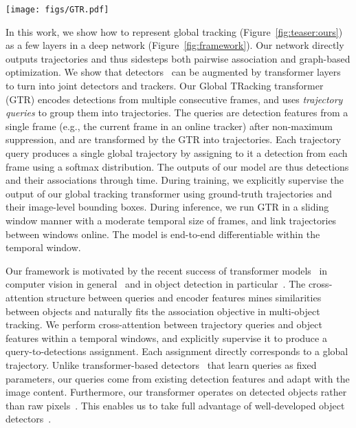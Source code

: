 \documentclass[10pt,twocolumn,letterpaper]{article}
\newcommand{\reffig}[1]{Figure~\ref{fig:#1}}
\newcommand{\lblfig}[1]{\label{fig:#1}}
\begin{document}
\begin{figure*}[!t]
\centering
   \texttt{[image: figs/GTR.pdf]}
   \caption{
   \textbf{Overview of our joint detection and tracking framework.} 
   An object detector first independently detects objects in all frames. Object features are concatenated and fed into the encoder of our global Tracking transformer (GTR). 
   The GTR additionally takes trajectory queries as decoder input, and produces association scores between each query and object.
   The association matrix links objects for each query.
   During testing, the trajectory queries are object features in the last frame.
   The structure of the transformer is shown in \reffig{structure}.
   }
\lblfig{framework}
\end{figure*}


In this work, we show how to represent global tracking (\reffig{teaser:ours}) as a few layers in a deep network (\reffig{framework}).
Our network directly outputs trajectories and thus sidesteps both pairwise association and graph-based optimization.
We show that detectors~\cite{ren2015faster,he2017mask,zhou2019objects} can be augmented by transformer layers to turn into joint detectors and trackers.
Our Global TRacking transformer (GTR) encodes detections from multiple consecutive frames, and uses \emph{trajectory queries} to group them into trajectories.
The queries are detection features from a single frame 
(e.g., the current frame in an online tracker) 
after non-maximum suppression, and are transformed by the GTR into trajectories.
Each trajectory query produces a single global trajectory by assigning to it a detection from each frame using a softmax distribution.
The outputs of our model are thus detections and their associations through time.
During training, we explicitly supervise the output of our global tracking transformer using ground-truth trajectories and their image-level bounding boxes.
During inference, we run GTR in a sliding window manner with a moderate temporal size of  frames, and link trajectories between windows online.
The model is end-to-end differentiable within the temporal window.

Our framework is motivated by the recent success of transformer models~\cite{vaswani2017attention} in computer vision in general~\cite{ZhaoJK20,dosovitskiy2020image,touvron2020deit,liu2021swin} and in object detection in particular~\cite{carion2020end,wang2020end}.
The cross-attention structure between queries and encoder features mines similarities between objects and naturally fits the association objective in multi-object tracking.
We perform cross-attention between trajectory queries and object features within a temporal windows, and explicitly supervise it to produce a query-to-detections assignment.
Each assignment directly corresponds to a global trajectory.
Unlike transformer-based detectors~\cite{carion2020end, wang2020end,meinhardt2021trackformer,transtrack} that learn queries as fixed parameters, our queries come from existing detection features and adapt with the image content.
Furthermore, our transformer operates on detected objects rather than raw pixels~\cite{carion2020end}.
This enables us to take full advantage of well-developed object detectors~\cite{zhou2021probablistic,he2017mask}.
\end{document}
